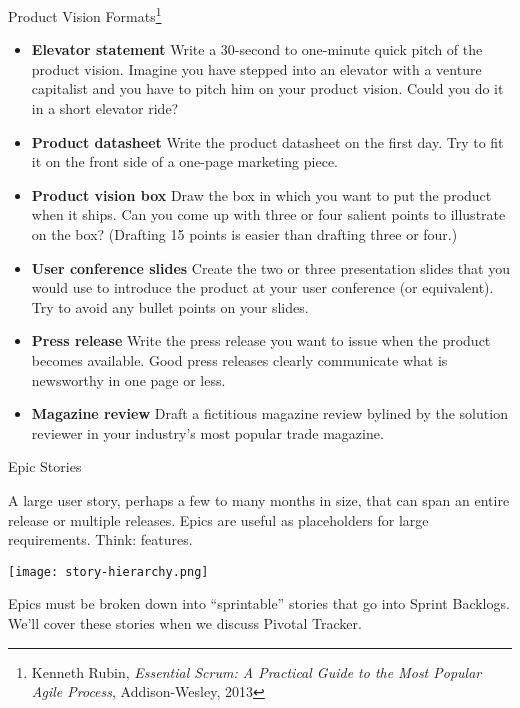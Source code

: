 \documentclass{beamer}
\begin{document}
\begin{frame}[fragile]{Product Vision Formats\footnote{Kenneth Rubin, {\it Essential Scrum: A Practical Guide to the Most Popular Agile Process}, Addison-Wesley, 2013}}


\scriptsize
\begin{itemize}
\item {\bf Elevator statement} Write a 30-second to one-minute quick pitch of the product vision. Imagine you have stepped into an elevator with a venture capitalist and you have to pitch him on your product vision. Could you do it in a short elevator ride?
\item {\bf Product datasheet} Write the product datasheet on the first day. Try to fit it on the front side of a one-page marketing piece.
\item {\bf Product vision box} Draw the box in which you want to put the product when it ships. Can you come up with three or four salient points to illustrate on the box? (Drafting 15 points is easier than drafting three or four.)
\item {\bf User conference slides} Create the two or three presentation slides that you would use to introduce the product at your user conference (or equivalent). Try to avoid any bullet points on your slides.
\item {\bf Press release} Write the press release you want to issue when the product becomes available. Good press releases clearly communicate what is newsworthy in one page or less.
\item {\bf Magazine review} Draft a fictitious magazine review bylined by the solution reviewer in your industry's most popular trade magazine.
\end{itemize}
\normalsize

\end{frame}

\begin{frame}[fragile]{Epic Stories}


A large user story, perhaps a few to many months in size, that can span an entire release or multiple releases. Epics are useful as placeholders for large requirements. Think: features.
\begin{center}
\texttt{[image: story-hierarchy.png]}
\end{center}

Epics must be broken down into ``sprintable'' stories that go into Sprint Backlogs.  We'll cover these stories when we discuss Pivotal Tracker.

\end{frame}
\end{document}
